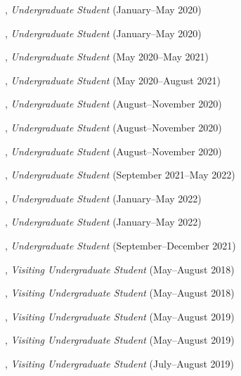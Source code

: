 \documentclass[10pt]{article}
\newenvironment{myindentpar}[1]%
{\begin{list}{}%
         {\setlength{\leftmargin}{#1}}%
         \item[]%
}
{\end{list}}
\newcounter{list}
\begin{document}
\begin{myindentpar}{0.75cm}
\hspace{-0.75cm}{\bf Alvin Alaphat}, \textit{Undergraduate Student} (January--May 2020)

\hspace{-0.75cm}{\bf Luke Marushack}, \textit{Undergraduate Student} (January--May 2020)

\hspace{-0.75cm}{\bf Michael Lee}, \textit{Undergraduate Student} (May 2020--May 2021)

\hspace{-0.75cm}{\bf Ms. Ann Hermann}, \textit{Undergraduate Student} (May 2020--August 2021)

\hspace{-0.75cm}{\bf Joseph Kuebler}, \textit{Undergraduate Student} (August--November 2020)

\hspace{-0.75cm}{\bf Facundo Munoz}, \textit{Undergraduate Student} (August--November 2020)

\hspace{-0.75cm}{\bf Fangcong Yin}, \textit{Undergraduate Student} (August--November 2020)

\hspace{-0.75cm}{\bf Jackson Ballow}, \textit{Undergraduate Student} (September 2021--May 2022)

\hspace{-0.75cm}{\bf Ryan Pairitz}, \textit{Undergraduate Student} (January--May 2022)

\hspace{-0.75cm}{\bf Kekoa Wang}, \textit{Undergraduate Student} (January--May 2022)

\hspace{-0.75cm}{\bf Ms. Longqing Chen}, \textit{Undergraduate Student} (September--December 2021)

\hspace{-0.75cm}{\bf Wenhao Yu}, \textit{Visiting Undergraduate Student} (May--August 2018)

\hspace{-0.75cm}{\bf Ms. Yu Shu}, \textit{Visiting Undergraduate Student} (May--August 2018)

\hspace{-0.75cm}{\bf Chuchen Deng}, \textit{Visiting Undergraduate Student} (May--August 2019)

\hspace{-0.75cm}{\bf Yihong Ma}, \textit{Visiting Undergraduate Student} (May--August 2019)

\hspace{-0.75cm}{\bf Xin Liu}, \textit{Visiting Undergraduate Student} (July--August 2019)


\end{myindentpar}
\end{document}
